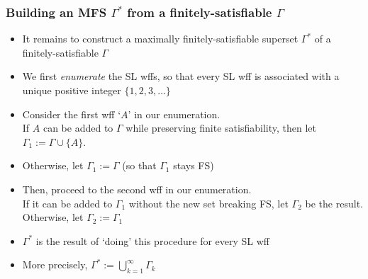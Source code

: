 \begin{frame}
\frametitle{Building an MFS $\Gamma^{\ast}$ from a finitely-satisfiable $\Gamma$}

\begin{itemize}[<+->]

\item It remains to construct a maximally finitely-satisfiable superset $\Gamma^{\ast}$ of a finitely-satisfiable $\Gamma$ 


\item We first \emph{enumerate} the SL wffs, so that every SL wff is associated with a unique positive integer $\{1, 2, 3, \dots \}$

\item Consider the first wff `$A$' in our enumeration. \\ If $A$ can be added to $\Gamma$ while preserving finite satisfiability, then let  $\Gamma_1 := \Gamma \cup \{A\}$. 

\item Otherwise, let  $\Gamma_1 := \Gamma$ (so that $\Gamma_1$ stays FS)


\item Then, proceed to the second wff in our enumeration. \\ If it can be added to $\Gamma_1$ without the new set breaking FS, let $\Gamma_2$ be the result. Otherwise, let $\Gamma_2 := \Gamma_1$

\item $\Gamma^{\ast}$ is the result of `doing' this procedure for every SL wff

\item More precisely, $\Gamma^{\ast} := \bigcup_{k=1}^{\infty} \Gamma_k$

\end{itemize}
\end{frame}

